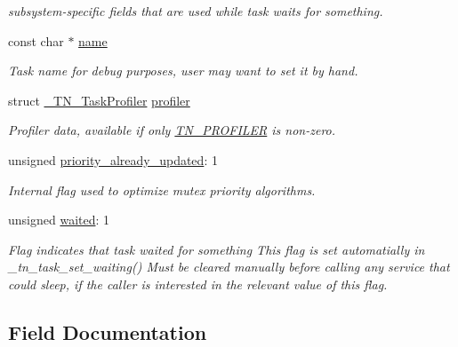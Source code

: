 \begin{DoxyCompactItemize}
\begin{tabbing}
\end{tabbing}\begin{DoxyCompactList}\small\item\em subsystem-\/specific fields that are used while task waits for something. \end{DoxyCompactList}\item 
\mbox{\label{structTN__Task_aed03c90906ffe2dcbcc49d8badc74147}} 
const char $\ast$ \hyperlink{structTN__Task_aed03c90906ffe2dcbcc49d8badc74147}{name}
\begin{DoxyCompactList}\small\item\em Task name for debug purposes, user may want to set it by hand. \end{DoxyCompactList}\item 
\mbox{\label{structTN__Task_a206bc3b05e1c660bb4ad9c032f1856b4}} 
struct \hyperlink{struct__TN__TaskProfiler}{\+\_\+\+T\+N\+\_\+\+Task\+Profiler} \hyperlink{structTN__Task_a206bc3b05e1c660bb4ad9c032f1856b4}{profiler}
\begin{DoxyCompactList}\small\item\em Profiler data, available if only {\ttfamily \hyperlink{tn__cfg__default_8h_a49a546b18cc1f75b51d4cf8b290634dd}{T\+N\+\_\+\+P\+R\+O\+F\+I\+L\+ER}} is non-\/zero. \end{DoxyCompactList}\item 
unsigned \hyperlink{structTN__Task_abb4d22974c7317dd610f646b9048656d}{priority\+\_\+already\+\_\+updated}\+: 1
\begin{DoxyCompactList}\small\item\em Internal flag used to optimize mutex priority algorithms. \end{DoxyCompactList}\item 
unsigned \hyperlink{structTN__Task_a47c3a0a27be1ee526a1599a2ca8bb269}{waited}\+: 1
\begin{DoxyCompactList}\small\item\em Flag indicates that task waited for something This flag is set automatially in {\ttfamily \+\_\+tn\+\_\+task\+\_\+set\+\_\+waiting()} Must be cleared manually before calling any service that could sleep, if the caller is interested in the relevant value of this flag. \end{DoxyCompactList}\end{DoxyCompactItemize}


\subsection{Field Documentation}
\mbox{\label{structTN__Task_a9354fa4b328e10ee9f8adb032e643892}} 
